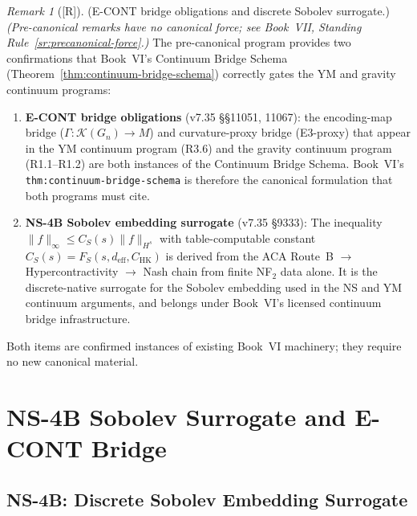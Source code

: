 \documentclass[12pt,oneside]{amsbook}
\theoremstyle{plain}
\theoremstyle{definition}
\theoremstyle{remark}
\newtheorem{remark}[theorem]{Remark}
\newcommand{\status}[1]{\textup{[#1]}}
\begin{document}
\begin{remark}[\status{R}]
\textup{(E-CONT bridge obligations and discrete Sobolev surrogate.)}
\textit{(Pre-canonical remarks have no canonical force;
see Book~VII, Standing Rule~\ref{sr:precanonical-force}.)}  
The pre-canonical program provides two confirmations that
Book~VI's Continuum Bridge Schema (Theorem~\ref{thm:continuum-bridge-schema})
correctly gates the YM and gravity continuum programs:
\begin{enumerate}[label=\textup{(\roman*)}]
  \item \textbf{E-CONT bridge obligations} (v7.35 \S\S11051, 11067):
    the encoding-map bridge ($\Gamma:\mathcal{K}(G_n)\to M$) and
    curvature-proxy bridge (E3-proxy) that appear in the YM continuum
    program (R3.6) and the gravity continuum program (R1.1--R1.2)
    are both instances of the Continuum Bridge Schema.  Book~VI's
    \texttt{thm:continuum-bridge-schema} is therefore the canonical
    formulation that both programs must cite.
  \item \textbf{NS-4B Sobolev embedding surrogate} (v7.35 \S9333):
    The inequality $\|f\|_\infty \leq C_S(s)\|f\|_{H^s}$ with
    table-computable constant $C_S(s) = F_S(s, d_{\mathrm{eff}},
    C_{\mathrm{HK}})$ is derived from the ACA Route~B
    $\to$ Hypercontractivity $\to$ Nash chain from finite NF$_2$
    data alone.  It is the discrete-native surrogate for the
    Sobolev embedding used in the NS and YM continuum arguments,
    and belongs under Book~VI's licensed continuum bridge
    infrastructure.
\end{enumerate}
Both items are confirmed instances of existing Book~VI machinery;
they require no new canonical material.
\end{remark}

\section{NS-4B Sobolev Surrogate and E-CONT Bridge}
\label{sec:sobolev-econt}

\subsection{NS-4B: Discrete Sobolev Embedding Surrogate}
\end{document}

